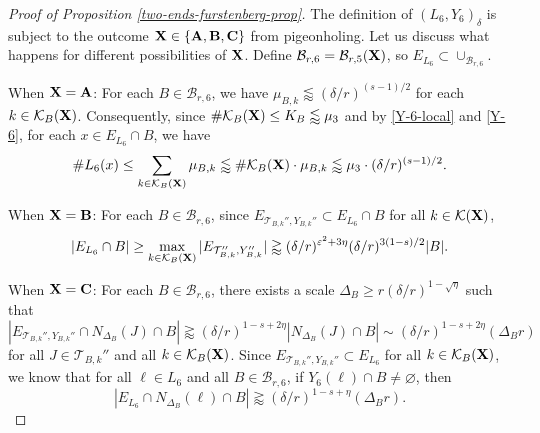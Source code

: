 \documentclass{amsart}
\numberwithin{equation}{section}
\newcommand{\de}{\delta}
\newcommand{\De}{\Delta}
\newcommand{\e}{\varepsilon}
\newcommand{\cb}{\mathcal B}
\newcommand{\ck}{{\mathcal K}}
\newcommand{\cT}{{\mathcal T}}
\begin{document}
\begin{proof}[Proof of Proposition \ref{two-ends-furstenberg-prop}]
\smallskip

The definition of  $(L_6, Y_6)_\de$ is subject to the outcome $\bf X\in\{A,B,C\}$ from pigeonholing.  
Let us discuss what happens for different possibilities of $\bf X$. 
Define $\cb_{r,6}=\cb_{r,5}(\bf X)$, so $E_{L_6}\subset \cup_{\cb_{r,6}}$.

When $\bf X=A$: For each $B\in\cb_{r,6}$, we have $\mu_{B,k} \lessapprox (\de/r)^{(s-1)/2}$ for each $k\in\ck_B(\bf X)$. 
Consequently, since $\#\ck_B({\bf X})\leq K_B\lessapprox \mu_3$ and by \eqref{Y-6-local} and \eqref{Y-6}, for each $x\in E_{L_6} \cap B$,  we have 
\begin{equation}
    \# L_6(x)\leq \sum_{k\in\ck_B(\bf X)}\mu_{B,k}\lessapprox \#\ck_B({\bf X})\cdot \mu_{B,k}\lessapprox \mu_3\cdot (\de/r)^{(s-1)/2}.
\end{equation}

When $\bf X=B$: For each $B\in\cb_{r,6}$, since $E_{\cT_{B,k}'', Y_{B,k}''}\subset E_{L_6}\cap B$ for all $k\in\ck(\bf X)$, 
\begin{equation}
    |E_{L_6}\cap B|\geq\max_{k\in\ck_B(\bf X)}|E_{\cT_{B,k}'', Y_{B,k}''}|\gtrapprox (\de/r)^{\e^2+3\eta}(\de/r)^{3(1-s)/2}|B|.
\end{equation} 

When $\bf X=C$: For each $B\in\cb_{r,6}$, there exists a scale $\De_B\geq r(\de/r)^{1-\sqrt{\eta}}$ such that $|E_{\cT_{B,k}'', Y_{B,k}''}\cap N_{\De_B}(J)\cap B |\gtrapprox (\de/r)^{1-s+2\eta}|N_{\De_B}(J)\cap B|\sim (\de/r)^{1-s+2\eta}(\De_B r)$ for all $J\in \cT_{B,k}''$ and all $k\in\ck_B(\bf X)$. 
Since  $E_{\cT_{B,k}'', Y_{B,k}''}\subset E_{L_6}$ for all $k\in\ck_B(\bf X)$, we know that for all $\ell\in L_6$ and all $B\in\cb_{r,6}$, if $Y_6(\ell)\cap B\not=\varnothing$, then
\begin{equation}
    |E_{L_6}\cap N_{\De_B}(\ell)\cap B|\gtrapprox  (\de/r)^{1-s+\eta}(\De_B r).
\end{equation}

\smallskip


\end{proof}
\end{document}
